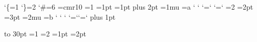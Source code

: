 %
%
%
%
%
%
\catcode`\{=1 \catcode`\}=2 \catcode`\#=6
\font\rip=cmr10
=1 =1pt =1pt plus 2pt =1mu ={a}
\def\m{A}
\sfcode` \mathcode` \lccode`\?=`\! \uccode`\?=`\!
{=2 =2pt =3pt =2mu ={b}
 \def\m{B}\let\n=\relax
 \catcode` \sfcode` \mathcode` \lccode`\?=`\@ \uccode`\?=`\@
 \hsize=50pt \parindent=1pt \baselineskip=9pt plus 1pt
 \hbox{}}

\vbox to 30pt{\hbox{}\vfill}
{\hbox{}}
%
%
{=1 =2 =1pt =2pt  }

